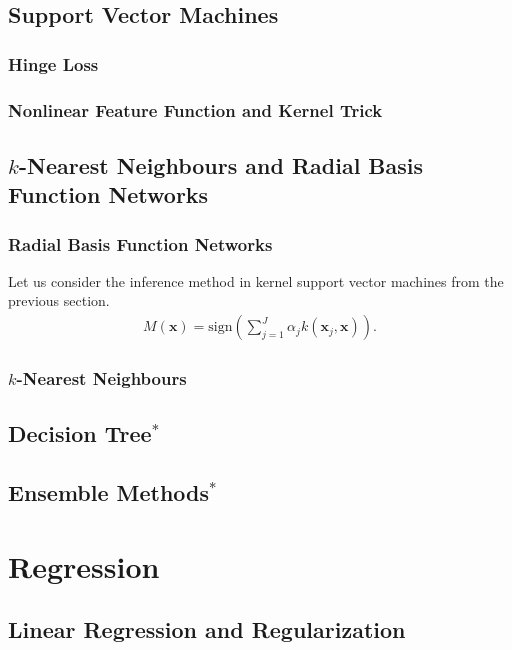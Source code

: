 \documentclass{report}
\newcommand{\vect}[1]{\mathbf{#1}}
\newcommand{\vx}[0]{\vect{x}}
\newcommand{\sign}{\text{sign}}
\newcommand{\todo}[1]{{\Large\textcolor{red}{#1}}}
\begin{document}
\todo{}


\subsection{Support Vector Machines}

\subsubsection{Hinge Loss}

\subsubsection{Nonlinear Feature Function and Kernel Trick}

\subsection{$k$-Nearest Neighbours and Radial Basis Function Networks}

\subsubsection{Radial Basis Function Networks}

Let us consider the inference method in kernel support vector machines from the
previous section. 
\begin{align*}
    M(\vx) = \sign \left(\sum_{j=1}^J \alpha_j k(\vx_j, \vx)\right).
\end{align*}


\subsubsection{$k$-Nearest Neighbours}


\subsection{Decision Tree$^*$}

\subsection{Ensemble Methods$^*$}


\section{Regression}
\label{sec:regression}

\subsection{Linear Regression and Regularization}
\end{document}
